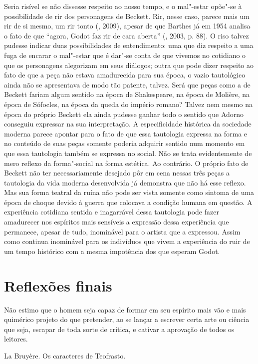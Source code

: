 Seria risível se não dissesse respeito ao nosso tempo, e o mal"-estar
opõe"-se à possibilidade de rir dos personagens de Beckett. Rir, nesse
caso, parece mais um rir de si mesmo, um rir tonto (, 2009),
apesar de que Barthes já em 1954 analisa o fato de que ``agora, Godot faz
rir de cara aberta'' (, 2003, p. 88). O riso talvez pudesse
indicar duas possibilidades de entendimento: uma que diz respeito a uma
fuga de encarar o mal"-estar que é dar"-se conta de que vivemos no
cotidiano o que os personagens alegorizam em seus diálogos; outra que
pode dizer respeito ao fato de que a peça não estava amadurecida para
sua época, o vazio tautológico ainda não se apresentava de modo tão
patente, talvez. Será que peças como a de Beckett fariam algum sentido
na época de Shakespeare, na época de Molière, na época de Sófocles, na
época da queda do império romano? Talvez nem mesmo na época do próprio
Beckett ela ainda pudesse ganhar todo o sentido que Adorno conseguiu
expressar na sua interpretação. A especificidade histórica da sociedade
moderna parece apontar para o fato de que essa tautologia expressa na
forma e no conteúdo de suas peças somente poderia adquirir sentido num momento
em que essa tautologia também se expressa no social. Não se
trata evidentemente de mero reflexo da forma"-social na forma estética.
Ao contrário. O próprio fato de Beckett não ter necessariamente desejado
pôr em cena nessas três peças a tautologia da vida moderna desenvolvida já
demonstra que não há esse reflexo. Mas sua forma teatral da ruína não
pode ser vista somente como sintoma de uma época de choque devido à
guerra que colocava a condição humana em questão. A experiência
cotidiana sentida e inagarrável dessa tautologia pode fazer amadurecer
nos espíritos mais sensíveis a expressão dessa experiência que
permanece, apesar de tudo, inominável para o artista que a expressou.
Assim como continua inominável para os indivíduos que vivem a
experiência do ruir de um tempo histórico com a mesma impotência dos que
esperam Godot.

\chapter{Reflexões finais}

\epigraph{Não estimo que o homem seja capaz de formar em seu espírito mais vão e
mais quimérico projeto do que pretender, ao se lançar a escrever certa
arte ou ciência que seja, escapar de toda sorte de crítica, e cativar a
aprovação de todos os leitores.}{La Bruyère. Os caracteres de Teofrasto.}

